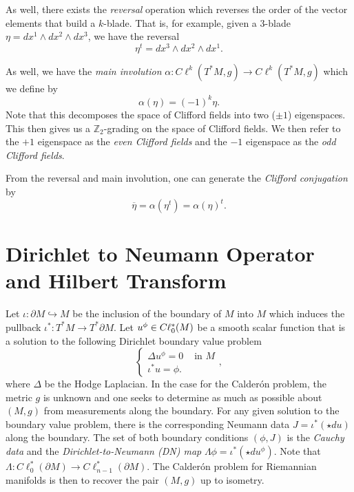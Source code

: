 \documentclass[12pt]{article}
\begin{document}
As well, there exists the \emph{reversal} operation which reverses the order of the vector elements that build a $k$-blade. That is, for example, given a $3$-blade $\eta = dx^1 \wedge dx^2 \wedge dx^3$, we have the reversal
\[
\eta^t = dx^3 \wedge dx^2 \wedge dx^1.
\]

As well, we have the \emph{main involution} $\alpha\colon C\ell^{k}(T^*M,g) \to C\ell^{k}(T^*M,g)$ which we define by 
\[
\alpha(\eta) = (-1)^k \eta.
\]
Note that this decomposes the space of Clifford fields into two ($\pm 1$) eigenspaces.  This then gives us a $\mathbb{Z}_2$-grading on the space of Clifford fields.  We then refer to the $+1$ eigenspace as the \emph{even Clifford fields} and the $-1$ eigenspace as the \emph{odd Clifford fields}.

From the reversal and main involution, one can generate the \emph{Clifford conjugation} by
\[
\overline{\eta} = \alpha(\eta^t) = \alpha(\eta)^t.
\]

\section{Dirichlet to Neumann Operator and Hilbert Transform}

Let $\iota \colon \partial M \hookrightarrow M$ be the inclusion of the boundary of $M$ into $M$ which induces the pullback $\iota^* \colon T^*M \to T^* \partial M$.  Let $u^\phi \in C\ell_{0}^*(M)$ be a smooth scalar function that is a solution to the following Dirichlet boundary value problem
\[
\begin{cases} \Delta u^\phi = 0 & \textrm{ in $M$} \\  \iota^* u = \phi. \end{cases},
\]
where $\Delta$ be the Hodge Laplacian.  In the case for the Calder\'on problem, the metric $g$ is unknown and one seeks to determine as much as possible about $(M,g)$ from measurements along the boundary. For any given solution to the boundary value problem, there is the corresponding Neumann data $J=\iota^*(\star d u)$ along the boundary.  The set of both boundary conditions $(\phi, J)$ is the \emph{Cauchy data} and the \emph{Dirichlet-to-Neumann (DN) map} $\Lambda \phi = \iota^*(\star d u^\phi)$. Note that $\Lambda \colon C\ell_0^*(\partial M) \to C\ell_{n-1}^*(\partial M)$. The Calder\'on problem for Riemannian manifolds is then to recover the pair $(M,g)$ up to isometry. 
\end{document}
